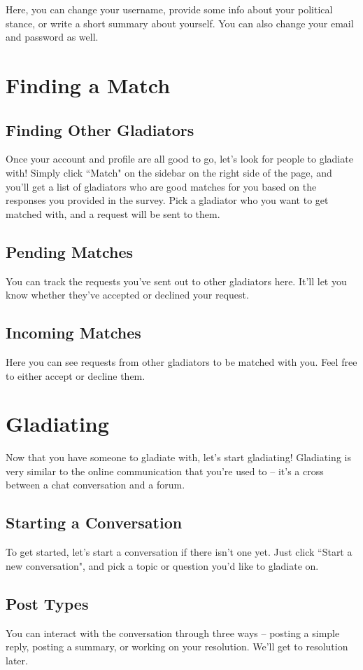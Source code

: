 \documentclass[12pt]{article}
\begin{document}
Here, you can change your username, provide some info about your political
stance, or write a short summary about yourself. You can also change your email
and password as well.

\section{Finding a Match}

\subsection{Finding Other Gladiators}
Once your account and profile are all good to go, let's look for people to
gladiate with! Simply click ``Match" on the sidebar on the right side of the
page, and you'll get a list of gladiators who are good matches for you based on
the responses you provided in the survey. Pick a gladiator who you want to get
matched with, and a request will be sent to them.

\subsection{Pending Matches}
You can track the requests you've sent out to other gladiators here. It'll let
you know whether they've accepted or declined your request.

\subsection{Incoming Matches}
Here you can see requests from other gladiators to be matched with you. Feel
free to either accept or decline them.

\section{Gladiating}
Now that you have someone to gladiate with, let's start gladiating! Gladiating
is very similar to the online communication that you're used to -- it's a cross
between a chat conversation and a forum.

\subsection{Starting a Conversation}
To get started, let's start a conversation if there isn't one yet. Just click
``Start a new conversation", and pick a topic or question you'd like to gladiate
on.

\subsection{Post Types}
You can interact with the conversation through three ways -- posting a simple
reply, posting a summary, or working on your resolution. We'll get to resolution
later.
\end{document}
